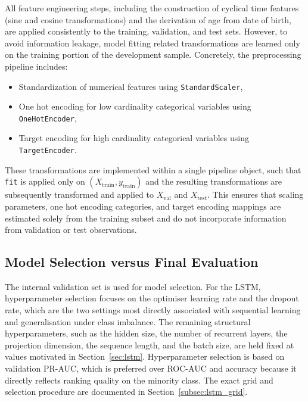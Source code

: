 \documentclass[oneside,12pt,parskip=half,american,numbers=noenddot]{scrreprt}
\begin{document}
All feature engineering steps, including the construction of cyclical time features (sine and cosine transformations) and the derivation of age from date of birth, are applied consistently to the training, validation, and test sets. However, to avoid information leakage, model fitting related transformations are learned only on the training portion of the development sample. Concretely, the preprocessing pipeline includes:
\begin{itemize}
    \item Standardization of numerical features using \texttt{StandardScaler},
    \item One hot encoding for low cardinality categorical variables using \texttt{OneHotEncoder},
    \item Target encoding for high cardinality categorical variables using \texttt{TargetEncoder}.
\end{itemize}
These transformations are implemented within a single pipeline object, such that \texttt{fit} is applied only on \((X_{\text{train}}, y_{\text{train}})\) and the resulting transformations are subsequently transformed and applied to \(X_{\text{val}}\) and \(X_{\text{test}}\). This ensures that scaling parameters, one hot encoding categories, and target encoding mappings are estimated solely from the training subset and do not incorporate information from validation or test observations.

\subsection{Model Selection versus Final Evaluation}

The internal validation set is used for model selection. For the LSTM, hyperparameter selection focuses on the optimiser learning rate and the dropout rate, which are the two settings most directly associated with sequential learning and generalisation under class imbalance. The remaining structural hyperparameters, such as the hidden size, the number of recurrent layers, the projection dimension, the sequence length, and the batch size, are held fixed at values motivated in Section~\ref{sec:lstm}. Hyperparameter selection is based on validation PR-AUC, which is preferred over ROC-AUC and accuracy because it directly reflects ranking quality on the minority class. The exact grid and selection procedure are documented in Section~\ref{subsec:lstm_grid}.
\end{document}

